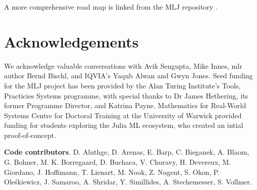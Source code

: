 \documentclass{article}
\begin{document}
A more comprehensive road map is linked from the MLJ repository \cite{MLJ}.

\section*{Acknowledgements}

We acknowledge valuable conversations with Avik Sengupta, Mike Innes, mlr author Bernd Bischl, and IQVIA's Yaqub Alwan and Gwyn Jones. Seed funding for the MLJ project has been provided by the Alan Turing Institute's Tools, Practicies Systems programme, with special thanks to Dr James Hethering, its former Programme Director, and Katrina Payne. Mathematics for Real-World Systems Centre for Doctoral Training at the University of Warwick provided funding for students exploring the Julia ML ecosystem, who created an intial proof-of-concept.

\textbf{Code contributors}. D. Aluthge, D. Arenas, E. Barp, C. Bieganek, A. Blaom, G. Bohner, M. K. Borregaard, D. Buchaca, V. Churavy, H. Devereux, M. Giordano, J. Hoffimann, T. Lienart, M. Nook, Z. Nugent, S. Okon, P. Oleśkiewicz, J. Samaroo, A. Shridar, Y. Simillides, A. Stechemesser, S. Vollmer.


\end{document}

